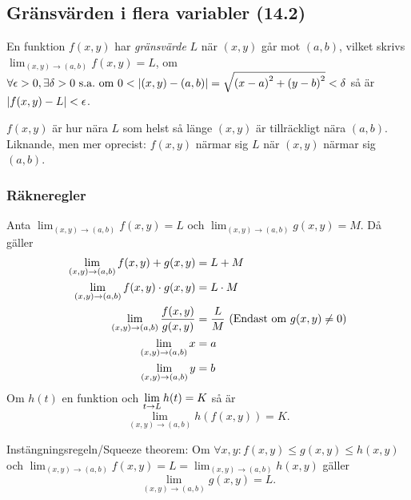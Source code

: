 \documentclass[a4paper]{article}
\begin{document}
\providecommand\fname{}
\renewcommand\fname{19-09-06}

\subsection{Gränsvärden i flera variabler (14.2)}
\begin{defn}
    En funktion \(
        f(x,y) 
    \) har \emph{gränsvärde} \(
        L
    \) när \(
        (x,y)
    \) går mot \(
        (a,b)
    \), vilket skrivs \(
        \lim_{(x,y) \to (a,b)} f(x,y) = L
    \), om \(
        \forall \epsilon > 0, \exists \delta > 0 \text{ s.a.\ om } 
        0 < \abs{(x,y) - (a,b)} = \sqrt{{(x-a)}^2 + {(y-b)}^2} < \delta  
    \) så är \(
        \abs{f(x,y) - L } < \epsilon
    \).
\end{defn}

\begin{defn}
    \(
        f(x,y) 
    \) är hur nära \(
        L
    \) som helst så länge \(
        (x,y)
    \) är tillräckligt nära \(
        (a,b)
    \). Liknande, men mer oprecist: \(
        f(x,y)
    \) närmar sig \(
        L
    \) när \(
        (x,y)
    \) närmar sig \(
        (a,b)
    \).
\end{defn}

\subsubsection{Räkneregler}
Anta \(
    \lim_{(x,y)\to (a,b)} f(x,y) = L
\) och \(
    \lim_{(x,y)\to (a,b)} g(x,y) = M
\). Då gäller 
\begin{align*}
    \lim_{(x,y)\to (a,b)} f(x,y) + g(x,y) &= L + M \\
    \lim_{(x,y)\to (a,b)} f(x,y)\cdot g(x,y) &= L \cdot M \\
    \lim_{(x,y)\to (a,b)} \displaystyle\frac{f(x,y)}{g(x,y)} &= \displaystyle\frac{L}{M} \text{ (Endast om } g(x,y) \neq 0\text{)} \\
    \lim_{(x,y)\to (a,b)} x &= a \\
    \lim_{(x,y)\to (a,b)} y &= b 
\end{align*}
Om \(
    h(t)
\) en funktion och \(
    \displaystyle\lim_{t \to L} h(t) = K
\) så är \[
    \lim_{(x,y)\to (a,b)} h(f(x,y)) = K.
\]

Instängningsregeln/Squeeze theorem: Om \(
    \forall x, y: f(x,y) \leq g(x,y) \leq h(x,y)
\) och \(
    \lim_{(x,y)\to (a,b)} f(x,y) = L = \lim_{(x,y)\to (a,b)} h(x,y)
\) gäller \[
    \lim_{(x,y)\to (a,b)} g(x,y) = L.
\] 
\end{document}
